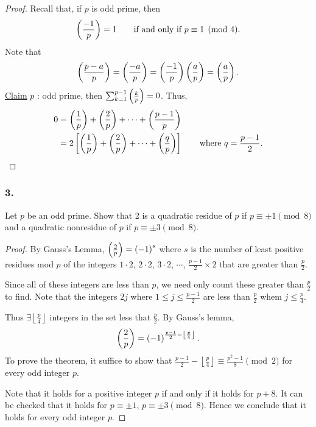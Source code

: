 \begin{proof}
    Recall that, if $p$ is odd prime, then
    \[
        \left(\frac{-1}{p}\right) = 1 \qquad \mbox{if and only if } p \equiv 1 \pmod{4}.
    \]
    Note that
    \[
        \left(\frac{p-a}{p}\right)=\left(\frac{-a}{p}\right)=\left(\frac{-1}{p}\right)\left(\frac{a}{p}\right)=\left(\frac{a}{p}\right).
    \]
    \underline{Claim} $p$ : odd prime, then $\sum_{k=1}^{p-1}\left(\frac{k}{p}\right)=0$. Thus,
    \begin{align*}
        0 &= \left(\frac{1}{p}\right)+\left(\frac{2}{p}\right)+\cdots+\left(\frac{p-1}{p}\right) \\
        &= 2\left[\left(\frac{1}{p}\right)+\left(\frac{2}{p}\right)+\cdots+\left(\frac{q}{p}\right)\right] \qquad \mbox{where } q=\frac{p-1}{2}.
    \end{align*}
\end{proof}

\subsubsection{3.} Let $p$ be an odd prime. Show that 2 is a quadratic residue
of $p$ if $p \equiv \pm 1 \pmod{8}$ and a quadratic nonresidue of $p$ if
$p \equiv \pm 3 \pmod{8}$.

\begin{proof}
    By Gauss's Lemma, $\left(\frac{2}{p}\right)=\left(-1\right)^s$
    where $s$ is the number of least positive residues mod $p$ of the integers $1\cdot 2$,
    $2 \cdot 2$, $3 \cdot 2$, $\cdots$, $\frac{p-1}{2}\times 2$ that are greater than $\frac{p}{2}$.  
    
    Since all of these integers are less than $p$, we need only count these greater than $\frac{p}{2}$ to find.
    Note that the integers $2j$ where $1\leq j\leq \frac{p-1}{2}$ are less than $\frac{p}{2}$ whem
    $j \leq \frac{p}{4}$.

    Thus $\exists \left\lfloor\frac{p}{4}\right\rfloor$ integers in the set less
    that $\frac{p}{2}$. By Gauss's lemma,
    \[
        \left(\frac{2}{p}\right) = \left(-1\right)^{\frac{p-1}{2} - \left\lfloor\frac{p}{4}\right\rfloor}.
    \]
    To prove the theorem, it suffice to show that $\frac{p-1}{2} - \left\lfloor\frac{p}{4}\right\rfloor \equiv \frac{p^2-1}{8} \pmod{2}$
    for every odd integer $p$.

    Note that it holds for a positive integer $p$ if and only if it holds for $p+8$.
    It can be checked that it holds for $p\equiv\pm 1$, $p\equiv\pm 3 \pmod{8}$.
    Hence we conclude that it holds for every odd integer $p$.
\end{proof}

